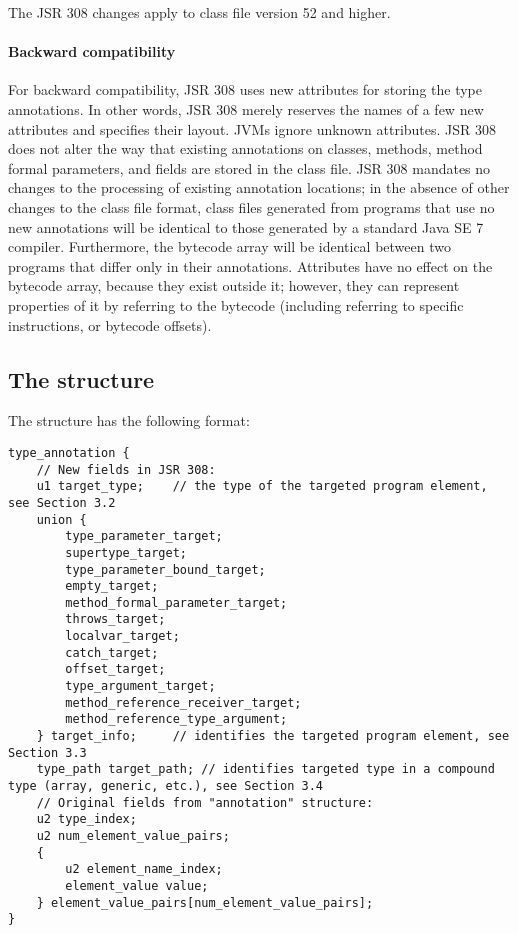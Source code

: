 \documentclass[10pt]{article}
\begin{document}
The JSR 308 changes apply to class file version 52 and higher.


\paragraph{Backward compatibility}
For backward compatibility, JSR 308 uses new attributes for storing
the type annotations.  In other words, JSR 308 merely reserves the
names of a few new attributes and specifies their layout.
JVMs ignore unknown
attributes.
JSR 308 does
not alter the way that existing annotations on classes, methods, method formal parameters,
and fields are stored in the class file.
JSR 308 mandates no changes to the processing of existing annotation locations;
in the absence of other changes to the class file format,
class files generated from programs that use no new
annotations will be identical to those generated by a standard Java SE 7
compiler.
Furthermore, the bytecode array will be identical between two programs that
differ only in their annotations.
Attributes have no effect on the bytecode array, because they exist outside
it; however, they can represent properties of it by referring to the
bytecode (including referring to specific instructions, or bytecode offsets).


\subsection{The  structure\label{class-file:ext}}

The \extendedannotation structure has the following format:

\preverbnegspace
\begin{Verbatim}
type_annotation {
    // New fields in JSR 308:
    u1 target_type;    // the type of the targeted program element, see Section 3.2
    union {
        type_parameter_target;
        supertype_target;
        type_parameter_bound_target;
        empty_target;
        method_formal_parameter_target;
        throws_target;
        localvar_target;
        catch_target;
        offset_target;
        type_argument_target;
        method_reference_receiver_target;
        method_reference_type_argument;
    } target_info;     // identifies the targeted program element, see Section 3.3
    type_path target_path; // identifies targeted type in a compound type (array, generic, etc.), see Section 3.4
    // Original fields from "annotation" structure:
    u2 type_index;
    u2 num_element_value_pairs;
    {
        u2 element_name_index;
        element_value value;
    } element_value_pairs[num_element_value_pairs];
}
\end{Verbatim}
\end{document}
